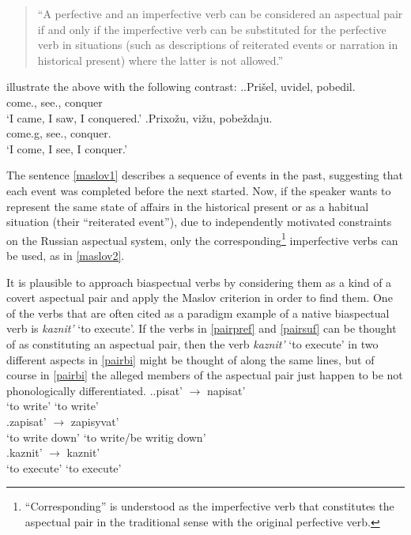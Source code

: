 \begin{quote}
``A perfective and an imperfective verb can be considered an aspectual pair if and only if the imperfective verb can be substituted for the perfective verb in situations (such as descriptions of reiterated events or narration in historical present) where the latter is not allowed.'' 
\end{quote}

\citet{Mikaelian:07} illustrate the above with the following contrast: 
\ex.\label{maslov}\ag.\label{maslov1}Pri\v{s}el\textsuperscript{\PF}, uvidel\textsuperscript{\PF}, pobedil.\textsuperscript{\PF}\\
come., see., conquer\\
\trans `I came, I saw, I conquered.'
\bg.\label{maslov2}Prixo\v{z}u\textsuperscript{\IPF}, vi\v{z}u\textsuperscript{\IPF}, pobe\v{z}daju.\textsuperscript{\IPF}\\
come.g, see., conquer.\\
\trans `I come, I see, I conquer.'

The sentence \ref{maslov1} describes a sequence of events in the past, suggesting that each event was completed before the next started. Now, if the speaker wants to represent the same state of affairs in the historical present or as a habitual situation (their ``reiterated event''), due to independently motivated constraints on the Russian aspectual system, only the corresponding\footnote{``Corresponding'' is understood as the imperfective verb that constitutes the aspectual pair in the traditional sense with the original perfective verb.} imperfective verbs can be used, as in \ref{maslov2}.

It is plausible to approach biaspectual verbs by considering them as a kind of a covert aspectual pair and apply the Maslov criterion in order to find them. One of the verbs that are often cited as a paradigm example of a native biaspectual verb is \emph{kaznit'} `to execute'. If the verbs in \ref{pairpref} and \ref{pairsuf} can be thought of as constituting an aspectual pair, then the verb \textit{kaznit'} `to execute' in two different aspects in \ref{pairbi} might be thought of along the same lines, but of course in \ref{pairbi} the alleged members of the aspectual pair just happen to be not phonologically differentiated.
\ex.\ag.\label{pairpref}{pisat'\textsuperscript{\IPF}} {$\rightarrow$} {napisat'\textsuperscript{\PF}}\\
{`to write'} {} {`to write'}\\
\bg.\label{pairsuf}{zapisat'\textsuperscript{\IPF}} {$\rightarrow$} {zapisyvat'\textsuperscript{\PF}}\\
{`to write down'} {} {`to write/be writig down'}\\
\bg.\label{pairbi}{kaznit'\textsuperscript{\IPF}} {$\rightarrow$} {kaznit'\textsuperscript{\PF}}\\
{`to execute'} {} {`to execute'}\\

